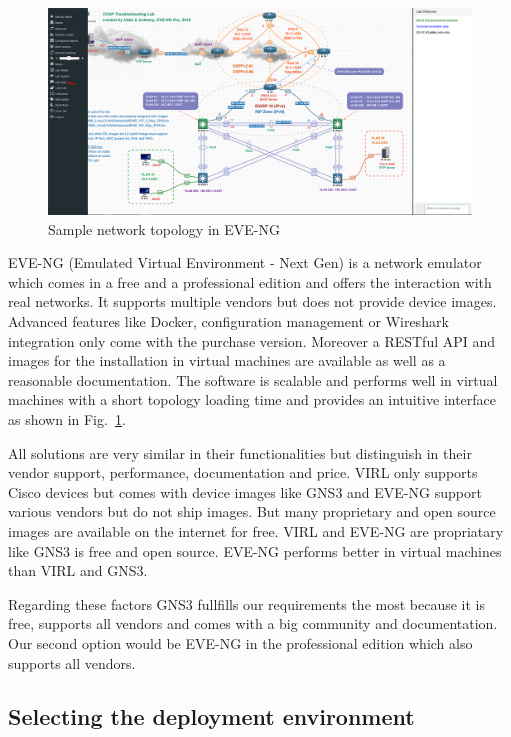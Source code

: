 \documentclass[conference]{IEEEtran}
\begin{document}
\begin{figure}[htbp]
\centerline{\includegraphics[scale=0.19]{eve-ng.png}}
\caption{Sample network topology in EVE-NG \cite{b6}}
\label{eve-ng}
\end{figure}

EVE-NG (Emulated Virtual Environment - Next Gen) is a network emulator which comes in a free and a professional edition and offers the interaction with real networks. It supports multiple vendors but does not provide device images. Advanced features like Docker, configuration management or Wireshark integration only come with the purchase version. Moreover a RESTful API and images for the installation in virtual machines are available as well as a reasonable documentation. The software is scalable and performs well in virtual machines with a short topology loading time and provides an intuitive interface as shown in Fig.~\ref{eve-ng}.  \cite{b1} \cite{b7}

All solutions are very similar in their functionalities but distinguish in their vendor support, performance, documentation and price. VIRL only supports Cisco devices but comes with device images like GNS3 and EVE-NG support various vendors but do not ship images. But many proprietary and open source images are available on the internet for free. VIRL and EVE-NG are propriatary like GNS3 is free and open source. EVE-NG performs better in virtual machines than VIRL and GNS3.

Regarding these factors GNS3 fullfills our requirements the most because it is free, supports all vendors and comes with a big community and documentation. Our second option would be EVE-NG in the professional edition which also supports all vendors.

\subsection{Selecting the deployment environment}
\end{document}
